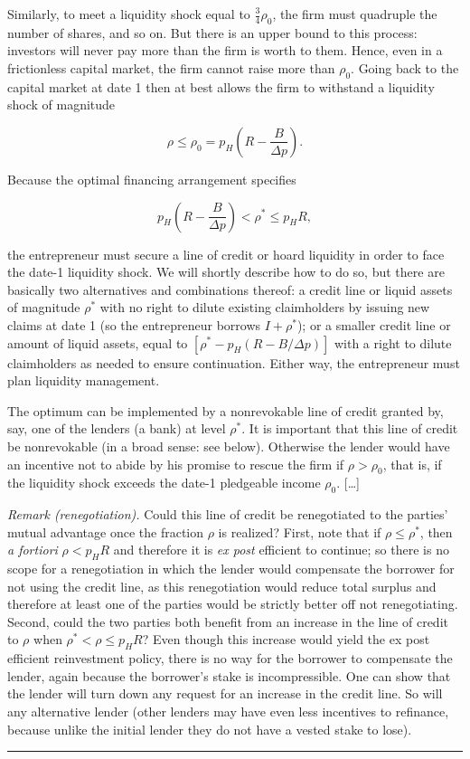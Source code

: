 \documentclass[11pt,a4paper]{article}
\newcommand{\stmtend}{\par\endgroup\nopagebreak\noindent\rule{\linewidth}{0.4pt}\par\medskip}
\begin{document}
Similarly, to meet a liquidity shock equal to \(\frac34\rho_0\), the firm must quadruple the number
of shares, and so on. But there is an upper bound to this process: investors will never pay more
than the firm is worth to them. Hence, even in a frictionless capital market, the firm cannot raise
more than \(\rho_0\). Going back to the capital market at date 1 then at best allows the firm to
withstand a liquidity shock of magnitude

\[\rho \leqslant \rho_0 = p_H\left(R - \frac{B}{\Delta p}\right).\]

Because the optimal financing arrangement specifies

\[p_H\left(R - \frac{B}{\Delta p}\right) < \rho^* \leqslant p_HR,\]

the entrepreneur must secure a line of credit or hoard liquidity in order to face the date-1
liquidity shock. We will shortly describe how to do so, but there are basically two alternatives and
combinations thereof: a credit line or liquid assets of magnitude \(\rho^*\) with no right to dilute
existing claimholders by issuing new claims at date 1 (so the entrepreneur borrows \(I + \rho^*\));
or a smaller credit line or amount of liquid assets, equal to \([\rho^* - p_H(R - B/\Delta p)]\)
with a right to dilute claimholders as needed to ensure continuation. Either way, the entrepreneur
must plan liquidity management.

The optimum can be implemented by a nonrevokable line of credit granted by, say, one of the lenders
(a bank) at level \(\rho^*\). It is important that this line of credit be nonrevokable (in a broad
sense: see below). Otherwise the lender would have an incentive not to abide by his promise to
rescue the firm if \(\rho > \rho_0\), that is, if the liquidity shock exceeds the date-1 pledgeable
income \(\rho_0\). {[}\ldots{]}

\emph{Remark (renegotiation).} Could this line of credit be renegotiated to the parties' mutual
advantage once the fraction \(\rho\) is realized? First, note that if \(\rho \leqslant \rho^*\),
then \emph{a fortiori} \(\rho < p_HR\) and therefore it is \emph{ex post} efficient to continue; so
there is no scope for a renegotiation in which the lender would compensate the borrower for not
using the credit line, as this renegotiation would reduce total surplus and therefore at least one
of the parties would be strictly better off not renegotiating. Second, could the two parties both
benefit from an increase in the line of credit to \(\rho\) when \(\rho^* < \rho \leqslant p_HR\)?
Even though this increase would yield the ex post efficient reinvestment policy, there is no way for
the borrower to compensate the lender, again because the borrower's stake is incompressible. One can
show that the lender will turn down any request for an increase in the credit line. So will any
alternative lender (other lenders may have even less incentives to refinance, because unlike the
initial lender they do not have a vested stake to lose).
\stmtend
\end{document}
